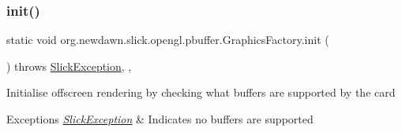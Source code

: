 \subsubsection{\texorpdfstring{init()}{init()}}
{\footnotesize\ttfamily static void org.\+newdawn.\+slick.\+opengl.\+pbuffer.\+Graphics\+Factory.\+init (\begin{DoxyParamCaption}{ }\end{DoxyParamCaption}) throws \mbox{\hyperlink{classorg_1_1newdawn_1_1slick_1_1_slick_exception}{Slick\+Exception}}\hspace{0.3cm}{\ttfamily [inline]}, {\ttfamily [static]}, {\ttfamily [private]}}

Initialise offscreen rendering by checking what buffers are supported by the card


\begin{DoxyExceptions}{Exceptions}
{\em \mbox{\hyperlink{classorg_1_1newdawn_1_1slick_1_1_slick_exception}{Slick\+Exception}}} & Indicates no buffers are supported \\
\hline
\end{DoxyExceptions}

